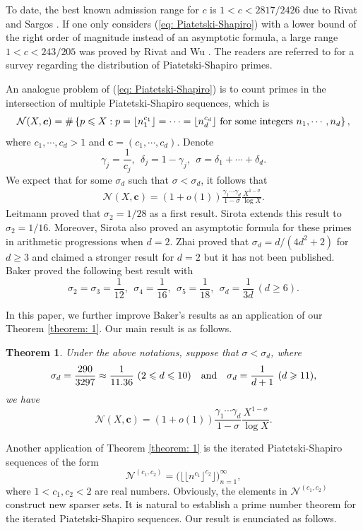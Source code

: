 \documentclass[12pt, reqno, twoside, letterpaper]{amsart}
\numberwithin{equation}{section}
\theoremstyle{customthm}
\newtheorem{theorem}[X]{Theorem}
\theoremstyle{customrem}
\renewcommand{\ge}{\ensuremath{\geqslant}}
\begin{document}
To date, the best known admission range for $c$ is $1<c<2817/2426$  due to  Rivat and Sargos \cite{RivatS2001}. If one only considers (\ref{eq: Piatetski-Shapiro}) with a lower bound of the right order of magnitude instead of an asymptotic formula, a large range $1<c< 243/205$ was proved by Rivat and Wu \cite{RivatW2001}. The readers are referred to \cite{Guo2021} for a survey regarding the distribution of Piatetski-Shapiro primes.

An analogue problem of (\ref{eq: Piatetski-Shapiro}) is to count primes in the intersection of multiple Piatetski-Shapiro sequences, which is
$$
\mathcal{N}(X,\boldsymbol{c})=\#\left\{p\leqslant X: p=\lfloor n_1^{c_1}\rfloor
=\cdots=\lfloor n_d^{c_d}\rfloor \hbox{\ for some integers}\ n_1,\cdots,n_d \right\},
$$
where $c_1,\cdots,c_d>1$ and $\boldsymbol{c}=(c_1,\cdots,c_d)$. Denote
$$
\gamma_j=\frac{1}{c_j},\ \ \delta_j=1-\gamma_j,\ \ \sigma=\delta_1+\cdots+\delta_d.
$$
We expect that for some $\sigma_d$ such that $\sigma<\sigma_d$, it follows that
\begin{align}\label{eq: Baker}
	\mathcal{N}(X,\boldsymbol{c})=(1+o(1))\frac{\gamma_1\cdots\gamma_d}
	{1-\sigma}\frac{X^{1-\sigma}}{\log X}.
\end{align}
Leitmann \cite{Leitmann1982} proved that $\sigma_2 = 1/28$ as a first result.  Sirota \cite{Sirota1983} extends this result to $\sigma_2 = 1/16$. Moreover, Sirota also proved an asymptotic formula for these primes in arithmetic progressions when $d=2$.  Zhai \cite{Zhai1999} proved that $\sigma_d = d/(4d^2+2)$ for $d \ge 3$ and claimed a stronger result for $d=2$ but it has not been published. Baker \cite{Baker2014} proved the following best result with
$$
\sigma_2=\sigma_3=\frac{1}{12},\ \ \sigma_4=\frac{1}{16},\ \ \sigma_5=\frac{1}{18},\ \
\sigma_d=\frac{1}{3d}\ (d\geqslant6).
$$

In this paper, we further improve Baker's results as an application of our Theorem \ref{theorem: 1}. Our main result is as follows.

\begin{theorem}\label{theorem: 2}
Under the above notations, suppose that $\sigma<\sigma_d$, where
$$
\sigma_d=\frac{290}{3297}\approx\frac{1}{11.36}\ (2\leqslant d\leqslant 10)\ \ \ \hbox{and}\ \ \
\sigma_d=\frac{1}{d+1}\ (d\geqslant 11),
$$
we have
$$
\mathcal{N}(X,\boldsymbol{c})=(1+o(1))\frac{\gamma_1\cdots\gamma_d}
{1-\sigma}\frac{X^{1-\sigma}}{\log X}.
$$
\end{theorem}

Another application of Theorem \ref{theorem: 1} is the iterated Piatetski-Shapiro sequences of the form
$$
\mathcal{N}^{(c_1,c_2)} = \big( \lfloor\lfloor n^{c_1}\rfloor ^{c_2}\rfloor\big)_{n=1}^{\infty},
$$
where $1<c_1,c_2<2$ are real numbers. Obviously, the elements in $\mathcal{N}^{(c_1,c_2)}$
construct new sparser sets. It is natural to establish a prime number theorem for the iterated Piatetski-Shapiro sequences. Our result is enunciated as follows.
\end{document}
